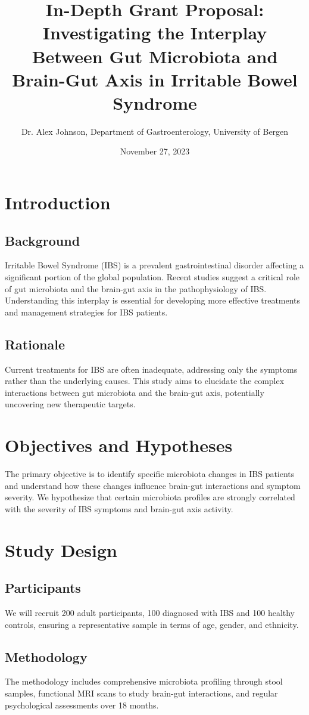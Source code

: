 \documentclass[11pt,a4paper]{article}
\title{In-Depth Grant Proposal: Investigating the Interplay Between Gut Microbiota and Brain-Gut Axis in Irritable Bowel Syndrome}
\author{Dr. Alex Johnson, Department of Gastroenterology, University of Bergen}
\date{November 27, 2023}
\begin{document}
\maketitle

\section{Introduction}
\subsection{Background}
Irritable Bowel Syndrome (IBS) is a prevalent gastrointestinal disorder affecting a significant portion of the global population. Recent studies suggest a critical role of gut microbiota and the brain-gut axis in the pathophysiology of IBS. Understanding this interplay is essential for developing more effective treatments and management strategies for IBS patients.

\subsection{Rationale}
Current treatments for IBS are often inadequate, addressing only the symptoms rather than the underlying causes. This study aims to elucidate the complex interactions between gut microbiota and the brain-gut axis, potentially uncovering new therapeutic targets.

\section{Objectives and Hypotheses}
The primary objective is to identify specific microbiota changes in IBS patients and understand how these changes influence brain-gut interactions and symptom severity. We hypothesize that certain microbiota profiles are strongly correlated with the severity of IBS symptoms and brain-gut axis activity.

\section{Study Design}
\subsection{Participants}
We will recruit 200 adult participants, 100 diagnosed with IBS and 100 healthy controls, ensuring a representative sample in terms of age, gender, and ethnicity.

\subsection{Methodology}
The methodology includes comprehensive microbiota profiling through stool samples, functional MRI scans to study brain-gut interactions, and regular psychological assessments over 18 months.
\end{document}

